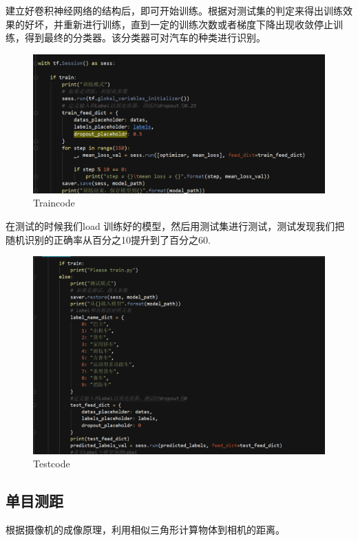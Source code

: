 \documentclass[12pt]{report}
\begin{document}
建立好卷积神经网络的结构后，即可开始训练。根据对测试集的判定来得出训练效果的好坏，并重新进行训练，直到一定的训练次数或者梯度下降出现收敛停止训练，得到最终的分类器。该分类器可对汽车的种类进行识别。



\begin{figure}[h]
  \includegraphics[width=15cm]{3.png} %
  \caption{Traincode} %
  \label{DirectedEdgeDetect} %
\end{figure}

在测试的时候我们load 训练好的模型，然后用测试集进行测试，测试发现我们把随机识别的正确率从百分之10提升到了百分之60.
\begin{figure}
  \includegraphics[width=15cm]{7.png} %
  \caption{Testcode} %
  \label{DirectedEdgeDetect} %
\end{figure}
\subsection{单目测距}
根据摄像机的成像原理，利用相似三角形计算物体到相机的距离。
\end{document}
